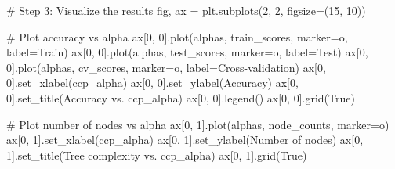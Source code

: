 \documentclass[
  letterpaper,
  DIV=11,
  numbers=noendperiod]{scrreprt}
\newenvironment{Shaded}{\begin{snugshade}}{\end{snugshade}}
\newcommand{\CommentTok}[1]{\textcolor[rgb]{0.37,0.37,0.37}{#1}}
\newcommand{\DecValTok}[1]{\textcolor[rgb]{0.68,0.00,0.00}{#1}}
\newcommand{\NormalTok}[1]{\textcolor[rgb]{0.00,0.23,0.31}{#1}}
\newcommand{\OperatorTok}[1]{\textcolor[rgb]{0.37,0.37,0.37}{#1}}
\newcommand{\StringTok}[1]{\textcolor[rgb]{0.13,0.47,0.30}{#1}}
\newcommand{\VariableTok}[1]{\textcolor[rgb]{0.07,0.07,0.07}{#1}}
\begin{document}
\begin{Shaded}
\begin{Highlighting}[]
\CommentTok{\# Step 3: Visualize the results}
\NormalTok{fig, ax }\OperatorTok{=}\NormalTok{ plt.subplots(}\DecValTok{2}\NormalTok{, }\DecValTok{2}\NormalTok{, figsize}\OperatorTok{=}\NormalTok{(}\DecValTok{15}\NormalTok{, }\DecValTok{10}\NormalTok{))}

\CommentTok{\# Plot accuracy vs alpha}
\NormalTok{ax[}\DecValTok{0}\NormalTok{, }\DecValTok{0}\NormalTok{].plot(alphas, train\_scores, marker}\OperatorTok{=}\StringTok{\textquotesingle{}o\textquotesingle{}}\NormalTok{, label}\OperatorTok{=}\StringTok{\textquotesingle{}Train\textquotesingle{}}\NormalTok{)}
\NormalTok{ax[}\DecValTok{0}\NormalTok{, }\DecValTok{0}\NormalTok{].plot(alphas, test\_scores, marker}\OperatorTok{=}\StringTok{\textquotesingle{}o\textquotesingle{}}\NormalTok{, label}\OperatorTok{=}\StringTok{\textquotesingle{}Test\textquotesingle{}}\NormalTok{)}
\NormalTok{ax[}\DecValTok{0}\NormalTok{, }\DecValTok{0}\NormalTok{].plot(alphas, cv\_scores, marker}\OperatorTok{=}\StringTok{\textquotesingle{}o\textquotesingle{}}\NormalTok{, label}\OperatorTok{=}\StringTok{\textquotesingle{}Cross{-}validation\textquotesingle{}}\NormalTok{)}
\NormalTok{ax[}\DecValTok{0}\NormalTok{, }\DecValTok{0}\NormalTok{].set\_xlabel(}\StringTok{\textquotesingle{}ccp\_alpha\textquotesingle{}}\NormalTok{)}
\NormalTok{ax[}\DecValTok{0}\NormalTok{, }\DecValTok{0}\NormalTok{].set\_ylabel(}\StringTok{\textquotesingle{}Accuracy\textquotesingle{}}\NormalTok{)}
\NormalTok{ax[}\DecValTok{0}\NormalTok{, }\DecValTok{0}\NormalTok{].set\_title(}\StringTok{\textquotesingle{}Accuracy vs. ccp\_alpha\textquotesingle{}}\NormalTok{)}
\NormalTok{ax[}\DecValTok{0}\NormalTok{, }\DecValTok{0}\NormalTok{].legend()}
\NormalTok{ax[}\DecValTok{0}\NormalTok{, }\DecValTok{0}\NormalTok{].grid(}\VariableTok{True}\NormalTok{)}

\CommentTok{\# Plot number of nodes vs alpha}
\NormalTok{ax[}\DecValTok{0}\NormalTok{, }\DecValTok{1}\NormalTok{].plot(alphas, node\_counts, marker}\OperatorTok{=}\StringTok{\textquotesingle{}o\textquotesingle{}}\NormalTok{)}
\NormalTok{ax[}\DecValTok{0}\NormalTok{, }\DecValTok{1}\NormalTok{].set\_xlabel(}\StringTok{\textquotesingle{}ccp\_alpha\textquotesingle{}}\NormalTok{)}
\NormalTok{ax[}\DecValTok{0}\NormalTok{, }\DecValTok{1}\NormalTok{].set\_ylabel(}\StringTok{\textquotesingle{}Number of nodes\textquotesingle{}}\NormalTok{)}
\NormalTok{ax[}\DecValTok{0}\NormalTok{, }\DecValTok{1}\NormalTok{].set\_title(}\StringTok{\textquotesingle{}Tree complexity vs. ccp\_alpha\textquotesingle{}}\NormalTok{)}
\NormalTok{ax[}\DecValTok{0}\NormalTok{, }\DecValTok{1}\NormalTok{].grid(}\VariableTok{True}\NormalTok{)}


\end{Highlighting}
\end{Shaded}
\end{document}
